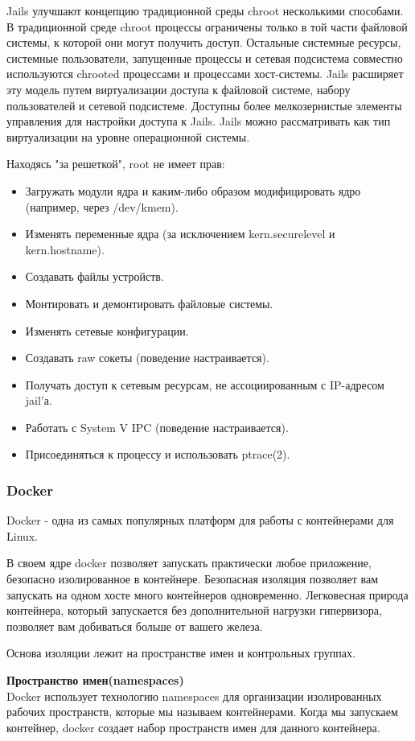 Jails улучшают концепцию традиционной среды chroot несколькими способами. В традиционной среде chroot процессы ограничены только в той части файловой системы, к которой они могут получить доступ. Остальные системные ресурсы, системные пользователи, запущенные процессы и сетевая подсистема совместно используются chrooted процессами и процессами хост-системы. Jails расширяет эту модель путем виртуализации доступа к файловой системе, набору пользователей и сетевой подсистеме. Доступны более мелкозернистые элементы управления для настройки доступа к Jails. Jails можно рассматривать как тип виртуализации на уровне операционной системы.


Находясь "за решеткой", root не имеет прав:
\begin{itemize}
\item Загружать модули ядра и каким-либо образом модифицировать ядро (например, через /dev/kmem).
\item Изменять переменные ядра (за исключением kern.securelevel и kern.hostname).
\item Создавать файлы устройств.
\item Монтировать и демонтировать файловые системы.
\item Изменять сетевые конфигурации.
\item Создавать raw сокеты (поведение настраивается).
\item Получать доступ к сетевым ресурсам, не ассоциированным с IP-адресом jail’а.
\item Работать с System V IPC (поведение настраивается).
\item Присоединяться к процессу и использовать ptrace(2).
\end{itemize}

\subsubsection{Docker}
Docker - одна из самых популярных платформ для работы с контейнерами для Linux.

В своем ядре docker позволяет запускать практически любое приложение, безопасно изолированное в контейнере. Безопасная изоляция позволяет вам запускать на одном хосте много контейнеров одновременно. Легковесная природа контейнера, который запускается без дополнительной нагрузки гипервизора, позволяет вам добиваться больше от вашего железа.

Основа изоляции лежит на пространстве имен и контрольных группах.

\textbf{Пространство имен(namespaces)}\\
Docker использует технологию namespaces для организации изолированных рабочих пространств, которые мы называем контейнерами. Когда мы запускаем контейнер, docker создает набор пространств имен для данного контейнера.

